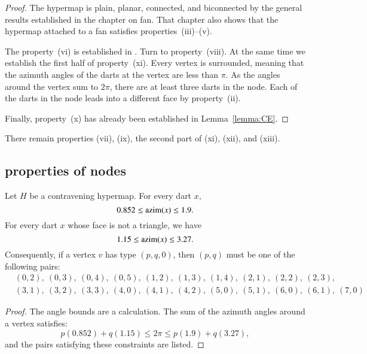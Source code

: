 \begin{proof}
The hypermap is plain, planar, connected, and biconnected by the general results established in the chapter on fan.  That chapter also shows that the hypermap attached to a fan satisfies properties~(iii)--(v).  

The property~(vi) is established in \cite[Lemma~3.7]{sp1}.
Turn to property~(viii). At the same time we establish the first half of property~(xi).  Every vertex is surrounded, meaning that the azimuth angles of the darts at the vertex are less than $\pi$.  As the angles around the vertex sum to $2\pi$, there are at least three darts in the node. Each of the darts in the node leads into a different face by property~(ii).

Finally, property~(x) has already been established in Lemma~\ref{lemma:CE}.
\end{proof}

There remain properties (vii), (ix), the second part of (xi), (xii), and (xiii).







\subsection{properties of nodes}




\begin{lemma} \label{lemma:0.852}
Let $H$ be a contravening
hypermap. For every dart $x$,
    $$0.852\le {\operatorname{azim}}(x)\le 1.9.$$
For every dart $x$ whose face is not a triangle, we have
    $$1.15\le{\operatorname{azim}}(x)\le 3.27.$$
Consequently, if a vertex $v$ has type $(p,q,0)$, then $(p,q)$
must be one of the following pairs:
$$
\begin{array}{lll}
&(0,2),~(0,3),~(0,4),~(0,5),~(1,2),~(1,3),~(1,4),~(2,1),~(2,2),~(2,3),\\
&(3,1),~(3,2),~(3,3),~(4,0),~(4,1),~(4,2),~(5,0),~(5,1),~(6,0),~(6,1),~(7,0)
\end{array}
$$
\end{lemma}
\begin{proof}
The angle bounds are a calculation.  The sum of the azimuth angles
around a vertex satisfies:
$$
  p (0.852) + q (1.15) \le 2\pi \le p (1.9) + q (3.27),
$$
and the pairs satisfying these constraints are listed.
\end{proof}

